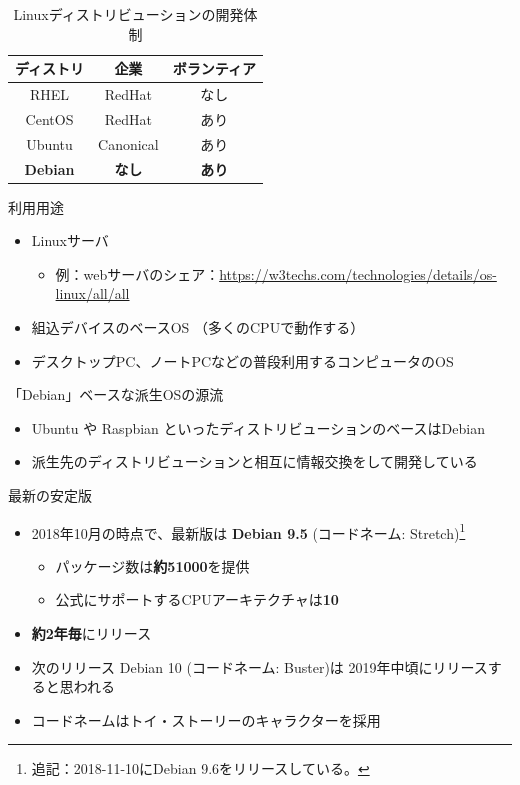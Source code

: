 \documentclass[mingoth,a4paper]{jsarticle}
\begin{document}
\begin{table}[htb]
  \begin{center}
    \caption{Linuxディストリビューションの開発体制}
    \begin{tabular}{|c|c|c|}
    \hline
    ディストリ & 企業 & ボランティア \\ \hline
    RHEL & RedHat & なし  \\ \hline
    CentOS & RedHat & あり \\ \hline
    Ubuntu  & Canonical & あり \\ \hline
    \bf{Debian}  & \bf{なし} & \bf{あり} \\ \hline
  \end{tabular}
  \end{center}
\end{table}

利用用途

\begin{itemize}
\item Linuxサーバ
  \begin{itemize}
  \item 例：webサーバのシェア：\url{https://w3techs.com/technologies/details/os-linux/all/all}
  \end{itemize}
\item 組込デバイスのベースOS （多くのCPUで動作する）
\item デスクトップPC、ノートPCなどの普段利用するコンピュータのOS
\end{itemize}

「Debian」ベースな派生OSの源流
\begin{itemize}
\item Ubuntu や Raspbian といったディストリビューションのベースはDebian
\item 派生先のディストリビューションと相互に情報交換をして開発している
\end{itemize}

最新の安定版
\begin{itemize}
  \item 2018年10月の時点で、最新版は {\bf{Debian 9.5}} (コードネーム: Stretch)\footnote{追記：2018-11-10にDebian 9.6をリリースしている。}
    \begin{itemize}
    \item パッケージ数は{\bf{約51000}}を提供
    \item 公式にサポートするCPUアーキテクチャは{\bf{10}}
    \end{itemize}
  \item {\bf{約2年毎}}にリリース
  \item 次のリリース Debian 10 (コードネーム: Buster)は 2019年中頃にリリースすると思われる
  \item コードネームはトイ・ストーリーのキャラクターを採用
\end{itemize}
\end{document}
